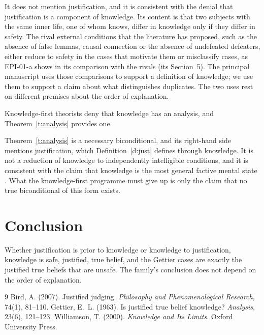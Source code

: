 \documentclass{situationist-preprint}
\begin{document}
\begin{reply}
It does not mention justification, and it is consistent with the denial that justification is a component of knowledge. Its content is that two subjects with the same inner life, one of whom knows, differ in knowledge only if they differ in safety. The rival external conditions that the literature has proposed, such as the absence of false lemmas, causal connection or the absence of undefeated defeaters, either reduce to safety in the cases that motivate them or misclassify cases, as EPI-01-a shows in its comparison with the rivals (its Section~5). The principal manuscript uses those comparisons to support a definition of knowledge; we use them to support a claim about what distinguishes duplicates. The two uses rest on different premises about the order of explanation.
\end{reply}

\begin{objection}
Knowledge-first theorists deny that knowledge has an analysis, and Theorem~\ref{t:analysis} provides one.
\end{objection}

\begin{reply}
Theorem~\ref{t:analysis} is a necessary biconditional, and its right-hand side mentions justification, which Definition~\ref{d:just} defines through knowledge. It is not a reduction of knowledge to independently intelligible conditions, and it is consistent with the claim that knowledge is the most general factive mental state \citep{Williamson2000}. What the knowledge-first programme must give up is only the claim that no true biconditional of this form exists.
\end{reply}

\section{Conclusion}

Whether justification is prior to knowledge or knowledge to justification, knowledge is safe, justified, true belief, and the Gettier cases are exactly the justified true beliefs that are unsafe. The family's conclusion does not depend on the order of explanation.

\begin{thebibliography}{9}\small
{} Bird, A. (2007). Justified judging. \emph{Philosophy and Phenomenological Research}, 74(1), 81--110.
 Gettier, E.~L. (1963). Is justified true belief knowledge? \emph{Analysis}, 23(6), 121--123.
 Williamson, T. (2000). \emph{Knowledge and Its Limits}. Oxford University Press.
\end{thebibliography}
\end{document}
